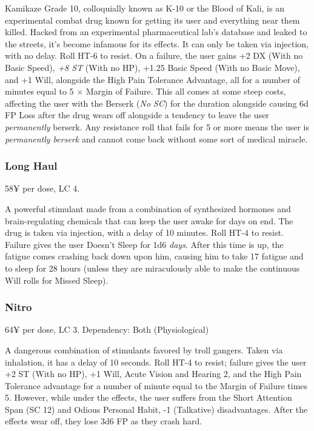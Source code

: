 Kamikaze Grade 10, colloquially known as K-10 or the Blood of Kali, is an experimental combat drug known for getting its user and everything near them killed. Hacked from an experimental pharmaceutical lab's database and leaked to the streets, it's become infamous for its effects. It can only be taken via injection, with no delay. Roll HT-6 to resist. On a failure, the user gains +2 DX (With no Basic Speed), \textit{+8 ST} (With no HP), +1.25 Basic Speed (With no Basic Move), and +1 Will, alongside the High Pain Tolerance Advantage, all for a number of minutes equal to 5 $\times$ Margin of Failure. This all comes at some steep costs, affecting the user with the Berserk (\textit{No SC}) for the duration alongside causing 6d FP Loss after the drug wears off alongside a tendency to leave the user \textit{permanently} berserk. Any resistance roll that fails for 5 or more means the user is \textit{permanently berserk} and cannot come back without some sort of medical miracle.

\subsubsection{Long Haul}
\begin{flushleft}
	58¥ per dose, LC 4.
\end{flushleft}

A powerful stimulant made from a combination of synthesized hormones and brain-regulating chemicals that can keep the user awake for days on end. The drug is taken via injection, with a delay of 10 minutes. Roll HT-4 to resist. Failure gives the user Doesn't Sleep for 1d6 \textit{days}. After this time is up, the fatigue comes crashing back down upon him, causing him to take 17 fatigue and to sleep for 28 hours (unless they are miraculously able to make the continuous Will rolls for Missed Sleep).

\subsubsection{Nitro}
\begin{flushleft}
	64¥ per dose, LC 3.
	Dependency: Both (Physiological)
\end{flushleft}

A dangerous combination of stimulants favored by troll gangers. Taken via inhalation, it has a delay of 10 seconds. Roll HT-4 to resist; failure gives the user +2 ST (With no HP), +1 Will, Acute Vision and Hearing 2, and the High Pain Tolerance advantage for a number of minute equal to the Margin of Failure times 5. However, while under the effects, the user suffers from the Short Attention Span (SC 12) and Odious Personal Habit, -1 (Talkative) disadvantages. After the effects wear off, they lose 3d6 FP as they crash hard.

